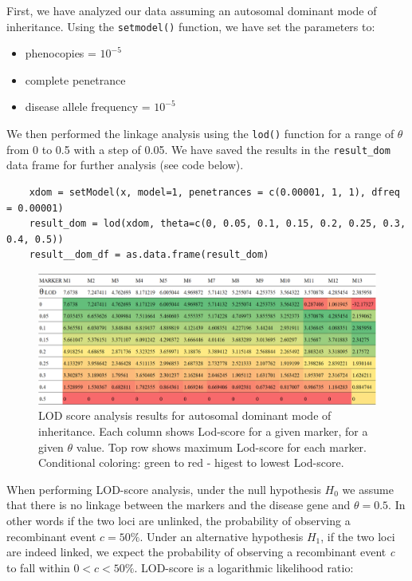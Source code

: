\documentclass[a4paper,12pt]{article}
\begin{document}
First, we have analyzed our data assuming an autosomal dominant mode of inheritance. Using the \texttt{setmodel()} function,
we have set the parameters to:
\begin{itemize}
    \item phenocopies = $10^{-5}$
    \item complete penetrance
    \item disease allele frequency = $10^{-5}$
\end{itemize}

We then performed the linkage analysis using the \texttt{lod()} function for a range of $\theta$ from 0 to 0.5 with a step of 0.05. 
We have saved the results in the \texttt{result\_dom} data frame for further analysis (see code below).

\begin{verbatim}
    xdom = setModel(x, model=1, penetrances = c(0.00001, 1, 1), dfreq = 0.00001)
    result_dom = lod(xdom, theta=c(0, 0.05, 0.1, 0.15, 0.2, 0.25, 0.3, 0.4, 0.5)) 
    result__dom_df = as.data.frame(result_dom)
\end{verbatim}

\begin{figure}[hb!] %
    \centering
    \includegraphics[width=\textwidth]{images/xdom_lod_analysis.png}
    \caption{LOD score analysis results for autosomal dominant mode of inheritance. Each column shows 
    Lod-score for a given marker, for a given $\theta$ value. Top row shows maximum Lod-score for each marker. 
    Conditional coloring: green to red - higest to lowest Lod-score.}   
    \label{fig:xdom_lodscore} 
    
\end{figure}

When performing LOD-score analysis, under the null hypothesis $\mathit{H_0}$ we assume 
that there is no linkage between the markers and the disease gene and $\mathit{\theta = 0.5}$. In other words if the two 
loci are unlinked, the probability of observing a recombinant event $\mathit{c = 50\%}$. Under an alternative
hypothesis $\mathit{H_1}$, if the two loci are indeed linked, we expect the probability of observing a recombinant 
event \textit{c} to fall within $0 < c < 50\%$. LOD-score is a logarithmic likelihood ratio:
\end{document}

